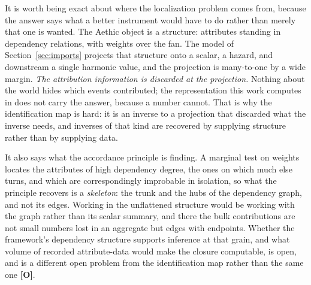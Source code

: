 \begin{remark}\label{gc:rem:flattening}
It is worth being exact about where the localization problem comes from,
because the answer says what a better instrument would have to do rather
than merely that one is wanted. The Aethic object is a structure: attributes standing in dependency
relations, with weights over the fan. The model of Section~\ref{sec:imports}
projects that structure onto a scalar, a hazard, and downstream a
single harmonic value, and the projection is many-to-one by a wide
margin. \emph{The attribution information is discarded at the
projection.} Nothing about the world hides which events contributed;
the representation this work computes in does not carry the answer,
because a number cannot. That is why the identification map is hard: it
is an inverse to a projection that discarded what the inverse needs, and
inverses of that kind are recovered by supplying structure rather than by
supplying data.

It also says what the accordance principle is finding. A marginal test on
weights locates the attributes of high dependency degree, the ones on
which much else turns, and which are correspondingly improbable in
isolation, so what the principle recovers is a \emph{skeleton}: the
trunk and the hubs of the dependency graph, and not its edges. Working in
the unflattened structure would be working with the graph rather than its
scalar summary, and there the bulk contributions are not small numbers
lost in an aggregate but edges with endpoints. Whether the framework's
dependency structure supports inference at that grain, and what
volume of recorded attribute-data would make the closure computable, is
open, and is a different open problem from the identification map rather
than the same one \textbf{[O]}.
\end{remark}


